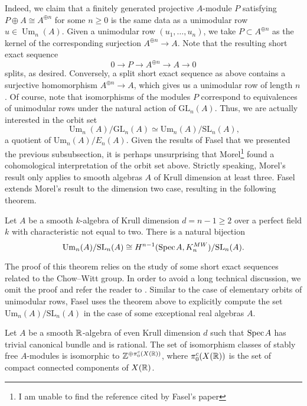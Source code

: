 Indeed, we claim that a finitely generated projective $A$-module $P$ satisfying $P \oplus A \cong A^{\oplus n}$ for some $n \geq 0$ is the same data as a unimodular row $u \in \operatorname{Um}_n(A)$. Given a unimodular row $(u_1,\ldots,u_n)$, we take $P \subset A^{\oplus n}$ as the kernel of the corresponding surjection $A^{\oplus n} \to A$. Note that the resulting short exact sequence \[0 \to P \to A^{\oplus n} \to A \to 0\] splits, as desired. Conversely, a split short exact sequence as above contains a surjective homomorphism $A^{\oplus n} \to A$, which gives us a unimodular row of length $n$. Of course, note that isomorphisms of the modules $P$ correspond to equivalences of unimodular rows under the natural action of $\mathrm{GL}_n(A)$. Thus, we are actually interested in the orbit set \[\operatorname{Um}_n(A)/\mathrm{GL}_n(A) \simeq \mathrm{Um}_n(A)/\mathrm{SL}_n(A),\] a quotient of $\mathrm{Um}_n(A)/E_n(A)$. Given the results of Fasel that we presented the previous subsubsection, it is perhaps unsurprising that Morel\footnote{I am unable to find the reference cited by Fasel's paper} found a cohomological interpretation of the  orbit set above. Strictly speaking, Morel's result only applies to smooth algebras $A$ of Krull dimension at least three. Fasel \cite[Theorem 4.11]{Fasel-unim} extends Morel's result to the dimension two case, resulting in the following theorem.

\begin{theorem}
    Let $A$ be a smooth $k$-algebra of Krull dimension $d = n-1 \geq 2$ over a perfect field $k$ with characteristic not equal to two. There is a natural bijection 
    \[
    \mathrm{Um}_n(A)/\mathrm{SL}_n(A) \cong H^{n-1}(\text{Spec}\hspace{0.1em} A, K^{MW}_n)/\mathrm{SL}_n(A).
    \]
\end{theorem}

The proof of this theorem relies on the study of some short exact sequences related to the Chow--Witt group. In order to avoid a long technical discussion, we omit the proof and refer the reader to \cite[Section 4]{Fasel-unim}. Similar to the case of elementary orbits of unimodular rows, Fasel uses the theorem above to explicitly compute the set $\mathrm{Um}_n(A)/\mathrm{SL}_n(A)$ in the case of some exceptional real algebras $A$.

\begin{theorem}\cite[Theorem 5.9]{Fasel-unim}\label{thm:fasel_stable}
    Let $A$ be a smooth $\mathbb{R}$-algebra of even Krull dimension $d$ such that $\text{Spec}\hspace{0.1em} A$ has trivial canonical bundle and is rational. The set of isomorphism classes of stably free $A$-modules is isomorphic to $\mathbb{Z}^{\oplus \pi_0^c(X(\mathbb{R}))}$, where $\pi_0^c(X(\mathbb{R}))$ is the set of compact connected components of $X(\mathbb{R})$.
\end{theorem}

